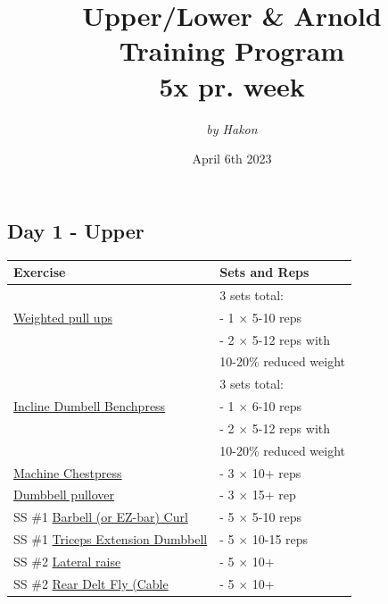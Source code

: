 \documentclass[11pt]{article}
\title{\Huge Upper/Lower \& Arnold  \\ Training Program \\ \large 5x pr. week}
\date{April 6th 2023}
\author{\textit{by Hakon}}
\begin{document}
\maketitle
\subsection*{Day 1 - Upper}
\begin{center}
\begin{tabular}{|l|l|}
\hline
\textbf{Exercise} & \textbf{Sets and Reps}\\
\hline
&  3 sets total: \\
\href{https://www.youtube.com/watch?v=eGo4IYlbE5g}{Weighted pull ups} & - 1 $\times$ 5-10 reps \\ 
& - 2  $\times$ 5-12 reps with \\ 
& 10-20\% reduced weight \\ 
\hline
& 3 sets total: \\
\href{https://www.youtube.com/watch?v=0f6-uCUKqgA}{Incline Dumbell Benchpress} & - 1  $\times$ 6-10 reps \\
& - 2  $\times$ 5-12 reps with \\
& 10-20\% reduced weight \\
\hline
\href{https://www.youtube.com/watch?v=dQw4w9WgXcQ}{Machine Chestpress} & - 3 $\times$ 10+ reps \\
\hline
\href{https://www.youtube.com/watch?v=FK4rHfWKEac}{Dumbbell pullover} & - 3 $\times$ 15+ rep\\
\hline
SS \#1  \href{https://www.youtube.com/watch?v=bAWLx7PPK10}{Barbell (or EZ-bar) Curl} & - 5 $\times$ 5-10 reps \\
SS \#1 \href{https://www.youtube.com/watch?v=_gsUck-7M74}{Triceps Extension Dumbbell} & - 5 $\times$ 10-15 reps \\ 
\hline
SS \#2 \href{https://www.youtube.com/watch?v=n5dsI9qQXwY}{Lateral raise} & - 5 $\times$ 10+ \\
SS \#2 \href{https://www.youtube.com/watch?v=JENKmsEZQO8}{Rear Delt Fly (Cable} & - 5 $\times$ 10+ \\
\hline
\end{tabular}
\end{center}
\end{document}
